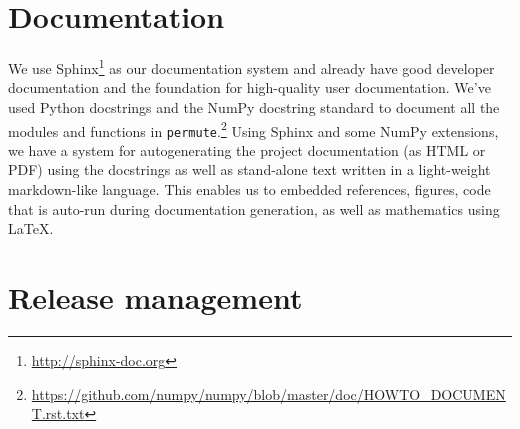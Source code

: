 %
%
%
%
%
%

\section{\label{sec:doc}Documentation}


We use Sphinx\footnote{\url{http://sphinx-doc.org}} as our documentation system
and already have good developer documentation and the foundation for
high-quality user documentation. We've used Python docstrings and the NumPy
docstring standard to document all the modules and functions in
\texttt{permute}.\footnote{\url{https://github.com/numpy/numpy/blob/master/doc/HOWTO\_DOCUMENT.rst.txt}}
Using Sphinx and some NumPy extensions, we have a system for autogenerating the
project documentation (as HTML or PDF) using the docstrings as well as
stand-alone text written in a light-weight markdown-like language.  This
enables us to embedded references, figures, code that is auto-run during
documentation generation, as well as mathematics using \LaTeX.

%

\section{\label{sec:release}Release management}

